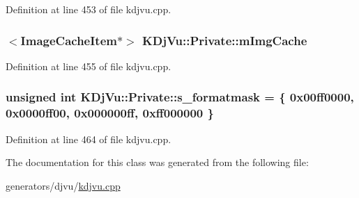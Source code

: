 Definition at line 453 of file kdjvu.\+cpp.

\hypertarget{classKDjVu_1_1Private_a447ca81b4cc0237ac52aa8bfadd1258e}{
\subsubsection[{m\+Img\+Cache}]{$<${\bf Image\+Cache\+Item}$\ast$$>$ K\+Dj\+Vu\+::\+Private\+::m\+Img\+Cache}}\label{classKDjVu_1_1Private_a447ca81b4cc0237ac52aa8bfadd1258e}


Definition at line 455 of file kdjvu.\+cpp.

\hypertarget{classKDjVu_1_1Private_a4faf2c57e9e0b65a5adf0d55115c6ae1}{
\subsubsection[{s\+\_\+formatmask}]{\setlength{\rightskip}{0pt plus 5cm}unsigned int K\+Dj\+Vu\+::\+Private\+::s\+\_\+formatmask = \{ 0x00ff0000, 0x0000ff00, 0x000000ff, 0xff000000 \}\hspace{0.3cm}{\ttfamily [static]}}}\label{classKDjVu_1_1Private_a4faf2c57e9e0b65a5adf0d55115c6ae1}


Definition at line 464 of file kdjvu.\+cpp.



The documentation for this class was generated from the following file\+:\begin{DoxyCompactItemize}
\item 
generators/djvu/\hyperlink{kdjvu_8cpp}{kdjvu.\+cpp}\end{DoxyCompactItemize}
